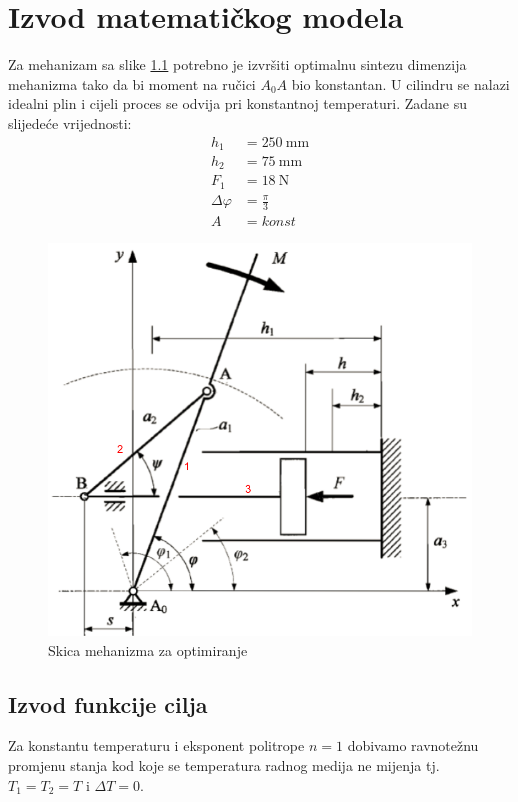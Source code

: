 \chapter{Izvod matematičkog modela}

Za mehanizam sa slike \ref{fig:mehanizma} potrebno je izvršiti optimalnu sintezu dimenzija mehanizma tako da bi moment na ručici $A_0A$ bio konstantan. U cilindru se nalazi idealni plin i cijeli proces se odvija pri konstantnoj temperaturi. Zadane su slijedeće vrijednosti:
\begin{align*}
h_1&=250\ \text{mm}\\
h_2&=75\ \text{mm}\\
F_1&=18\ \text{N}\\
\Delta \varphi &=\frac{\pi}{3}\\
A&=konst
\end{align*}

\begin{figure}[H]
\center
\includegraphics[scale=.4]{slike/mehanizam.png}
\caption[Skica mehanizma za optimiranje]{Skica mehanizma za optimiranje \cite{Chiang2000}}
\label{fig:mehanizma}
\end{figure}

\section{Izvod funkcije cilja}
\quad Za konstantu temperaturu i eksponent politrope $n=1$ dobivamo ravnotežnu promjenu stanja kod koje se temperatura radnog medija ne mijenja tj. $T_1=T_2=T$ i $\Delta T=0$.\\

